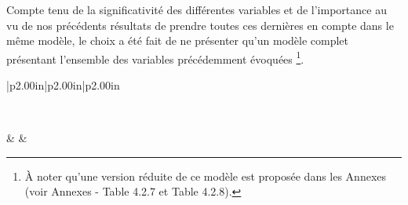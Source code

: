 \documentclass[
  12,
  a4paper,
]{report}
\begin{document}
Compte tenu de la significativité des différentes variables et de
l'importance au vu de nos précédents résultats de prendre toutes ces
dernières en compte dans le même modèle, le choix a été fait de ne
présenter qu'un modèle complet présentant l'ensemble des variables
précédemment évoquées
\footnote{À noter qu'une version réduite de ce modèle est proposée dans les Annexes (voir Annexes - Table 4.2.7 et Table 4.2.8).}.

\newpage
\begin{singlespace}
\providecommand{\docline}[3]{\noalign{\global\setlength{\arrayrulewidth}{#1}}\arrayrulecolor[HTML]{#2}\cline{#3}}

\setlength{\tabcolsep}{2pt}

\renewcommand*{\arraystretch}{1.5}

\begin{longtable}[c]{|p{2.00in}|p{2.00in}|p{2.00in}}

\caption{Modèle sur l'orientation entre les différentes classes de la CAH
}\\


 &  &  \\



\end{longtable}
\end{singlespace}
\end{document}

